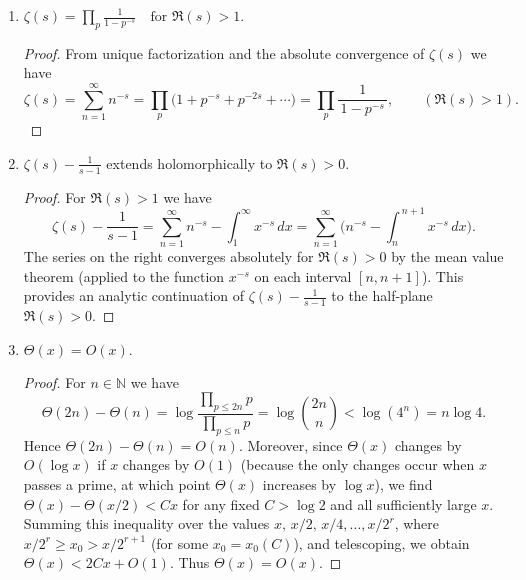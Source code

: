 \documentclass{article}
\begin{document}
\renewcommand{\labelenumi}{(\Roman{enumi}).}
\begin{enumerate}
\item $\displaystyle \zeta(s)=\prod_{p}\frac{1}{1-p^{-s}}\quad \text{for }\Re(s)>1.$
\begin{proof}
From unique factorization and the absolute convergence of $\zeta(s)$ we have 
\[
\zeta(s)=\sum_{n=1}^\infty n^{-s} = \prod_{p}\Big(1 + p^{-s} + p^{-2s} + \cdots\Big) = \prod_{p}\frac{1}{\,1-p^{-s}\,},\qquad (\Re(s)>1).
\] 
\end{proof}

\item $\displaystyle \zeta(s) - \frac{1}{s-1}$ extends holomorphically to $\Re(s)>0.$ 
\begin{proof}
For $\Re(s)>1$ we have 
\[
\zeta(s) - \frac{1}{s-1} = \sum_{n=1}^\infty n^{-s} - \int_{1}^{\infty}x^{-s}\,dx = \sum_{n=1}^{\infty}\Big(n^{-s} - \int_{n}^{\,n+1}x^{-s}\,dx\Big).
\] 
The series on the right converges absolutely for $\Re(s)>0$ by the mean value theorem (applied to the function $x^{-s}$ on each interval $[n,n+1]$). This provides an analytic continuation of $\zeta(s)-\frac{1}{s-1}$ to the half-plane $\Re(s)>0$.
\end{proof}

\item $\displaystyle \Theta(x)=O(x).$
\begin{proof}
For $n\in\mathbb{N}$ we have 
\[
\Theta(2n)-\Theta(n) = \log\frac{\prod_{p\le 2n}p}{\prod_{p\le n}p} = \log\binom{2n}{n} < \log(4^n) = n\log 4.
\] 
Hence $\Theta(2n)-\Theta(n) = O(n)$. Moreover, since $\Theta(x)$ changes by $O(\log x)$ if $x$ changes by $O(1)$ (because the only changes occur when $x$ passes a prime, at which point $\Theta(x)$ increases by $\log x$), we find $\Theta(x) - \Theta(x/2) < Cx$ for any fixed $C > \log 2$ and all sufficiently large $x$. Summing this inequality over the values $x,\,x/2,\,x/4,\dots, x/2^r$, where $x/2^r \ge x_0 > x/2^{r+1}$ (for some $x_0=x_0(C)$), and telescoping, we obtain $\Theta(x) < 2Cx + O(1)$. Thus $\Theta(x)=O(x)$.
\end{proof}


\end{enumerate}
\end{document}
